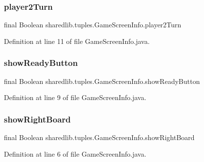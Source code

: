 \subsubsection{\texorpdfstring{player2\+Turn}{player2Turn}}
{\footnotesize\ttfamily final Boolean sharedlib.\+tuples.\+Game\+Screen\+Info.\+player2\+Turn}



Definition at line 11 of file Game\+Screen\+Info.\+java.

\hypertarget{classsharedlib_1_1tuples_1_1_game_screen_info_a6ad33a0d9b3ccc289366498b863037d7}{}\label{classsharedlib_1_1tuples_1_1_game_screen_info_a6ad33a0d9b3ccc289366498b863037d7} 
\subsubsection{\texorpdfstring{show\+Ready\+Button}{showReadyButton}}
{\footnotesize\ttfamily final Boolean sharedlib.\+tuples.\+Game\+Screen\+Info.\+show\+Ready\+Button}



Definition at line 9 of file Game\+Screen\+Info.\+java.

\hypertarget{classsharedlib_1_1tuples_1_1_game_screen_info_a0f37c050a0cfbf35d993ca4af17df941}{}\label{classsharedlib_1_1tuples_1_1_game_screen_info_a0f37c050a0cfbf35d993ca4af17df941} 
\subsubsection{\texorpdfstring{show\+Right\+Board}{showRightBoard}}
{\footnotesize\ttfamily final Boolean sharedlib.\+tuples.\+Game\+Screen\+Info.\+show\+Right\+Board}



Definition at line 6 of file Game\+Screen\+Info.\+java.

\hypertarget{classsharedlib_1_1tuples_1_1_game_screen_info_a392cdcfa4234bd8eb9589cd524d3a356}{}\label{classsharedlib_1_1tuples_1_1_game_screen_info_a392cdcfa4234bd8eb9589cd524d3a356} 
